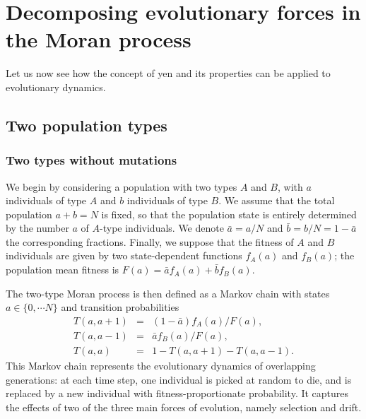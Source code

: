 \documentclass[aps,prd,11pt,notitlepage,nofootinbib,superscriptaddress,showkeys,letterpaper]{revtex4-1}
\begin{document}
\section{Decomposing evolutionary forces in the Moran process}

Let us now see how the concept of yen and its properties can be applied to evolutionary dynamics. 


\subsection{Two population types}


\subsubsection{Two types without mutations}

We begin by considering a population with two types $A$ and $B$, with $a$ individuals of type $A$ and $b$ individuals of type $B$. We assume that the total population $a+b=N$ is fixed, so that the population state is entirely determined by the number $a$ of $A$-type individuals. We denote $\bar{a}=a/N$ and $\bar{b}=b/N=1-\bar{a}$ the corresponding fractions. Finally, we suppose that the fitness of $A$ and $B$ individuals are given by two state-dependent functions $f_A(a)$ and $f_B(a)$; the population mean fitness is $F(a)=\bar{a}f_A(a)+\bar{b}f_B(a)$. 

The two-type Moran process is then defined as a Markov chain with states $a\in\{0,\cdots N\}$ and transition probabilities
\begin{eqnarray}
        T(a,a+1)&=&(1-\bar{a})f_A(a)/F(a),\\
        T(a,a-1)&=&\bar{a}f_B(a)/F(a),\\
        T(a,a)&=&1-T(a,a+1)-T(a,a-1).
\end{eqnarray} 
This Markov chain represents the evolutionary dynamics of overlapping generations: at each time step, one individual is picked at random to die, and is replaced by a new individual with fitness-proportionate probability. It captures the effects of two of the three main forces of evolution, namely selection and drift.  
\end{document}

